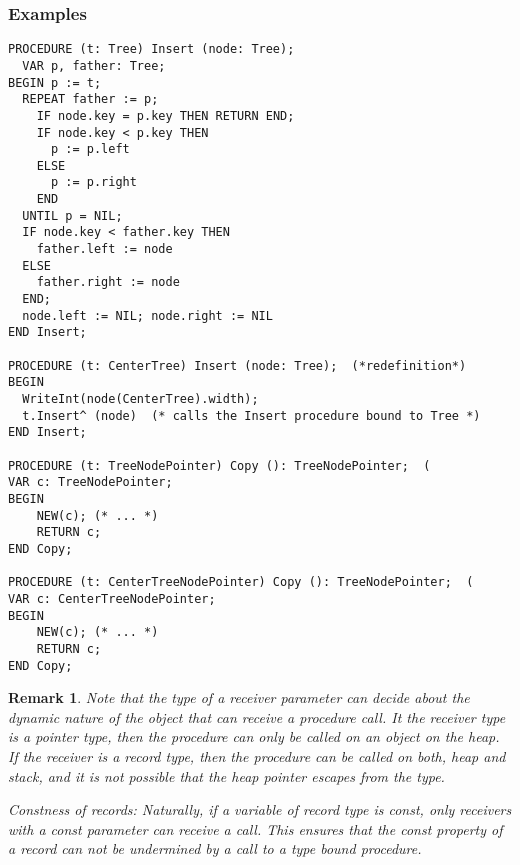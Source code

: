 \documentclass[a4wide,11pt]{article}
\newtheorem{remark}{Remark}
\begin{document}
\begin{annotation}
\subsubsection{Examples}
\begin{lstlisting}[style=example]
PROCEDURE (t: Tree) Insert (node: Tree);
  VAR p, father: Tree;
BEGIN p := t;
  REPEAT father := p;
    IF node.key = p.key THEN RETURN END;
    IF node.key < p.key THEN
      p := p.left
    ELSE
      p := p.right
    END
  UNTIL p = NIL;
  IF node.key < father.key THEN
    father.left := node
  ELSE
    father.right := node
  END;
  node.left := NIL; node.right := NIL
END Insert;

PROCEDURE (t: CenterTree) Insert (node: Tree);  (*redefinition*)
BEGIN
  WriteInt(node(CenterTree).width);
  t.Insert^ (node)  (* calls the Insert procedure bound to Tree *)
END Insert;

PROCEDURE (t: TreeNodePointer) Copy (): TreeNodePointer;  (
VAR c: TreeNodePointer;
BEGIN
	NEW(c); (* ... *)
	RETURN c;
END Copy;

PROCEDURE (t: CenterTreeNodePointer) Copy (): TreeNodePointer;  (
VAR c: CenterTreeNodePointer;
BEGIN
	NEW(c); (* ... *)
	RETURN c;
END Copy;

\end{lstlisting}

\begin{remark} Note that the type of a receiver parameter can decide about the dynamic nature of the object that can receive a procedure call.
It the receiver type is a pointer type, then the procedure can only be called on an object on the heap.
If the receiver is a record type, then the procedure can be called on both, heap and stack, and it is not possible that the heap pointer escapes from the type.

Constness of records: Naturally, if a variable of record type is const, only receivers with a const parameter can receive a call.
This ensures that the const property of a record can not be undermined by a call to a type bound procedure.
\end{remark}

\end{annotation}
\end{document}
